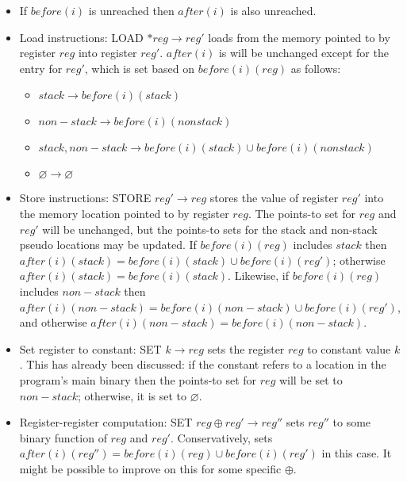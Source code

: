 \begin{itemize}
\item
  If $before(i)$ is unreached then $after(i)$ is also unreached.
\item
  Load instructions: LOAD ${\ast}reg \rightarrow reg'$ loads from the
  memory pointed to by register $reg$ into register $reg'$.
  $after(i)$ is will be unchanged except for the entry for $reg'$,
  which is set based on $before(i)(reg)$ as follows:

  \begin{itemize}
  \item $stack \rightarrow before(i)(stack)$
  \item $non-stack \rightarrow before(i)(nonstack)$
  \item ${stack,non-stack} \rightarrow before(i)(stack) {\cup} before(i)(nonstack)$
  \item $\varnothing \rightarrow \varnothing$ 
  \end{itemize}

\item
  Store instructions: STORE $reg' \rightarrow reg$ stores the value of
  register $reg'$ into the memory location pointed to by register
  $reg$.  The points-to set for $reg$ and $reg'$ will be unchanged,
  but the points-to sets for the stack and non-stack pseudo locations
  may be updated.  If $before(i)(reg)$ includes $stack$ then
  $after(i)(stack) = before(i)(stack) \cup before(i)(reg')$; otherwise
  $after(i)(stack) = before(i)(stack)$.  Likewise, if $before(i)(reg)$
  includes $non-stack$ then $after(i)(non-stack) =
  before(i)(non-stack) \cup before(i)(reg')$, and otherwise
  $after(i)(non-stack) = before(i)(non-stack)$.
\item
  Set register to constant: SET $k \rightarrow reg$ sets the register
  $reg$ to constant value $k$.  This has already been discussed: if
  the constant refers to a location in the program's main binary then
  the points-to set for $reg$ will be set to $non-stack$; otherwise,
  it is set to $\varnothing$.
\item
  Register-register computation: SET $reg \oplus reg' \rightarrow
  reg''$ sets $reg''$ to some binary function of $reg$ and $reg'$.
  Conservatively, {\technique} sets $after(i)(reg'') = before(i)(reg)
  \cup before(i)(reg')$ in this case.  It might be possible to improve
  on this for some specific $\oplus$.


\end{itemize}
